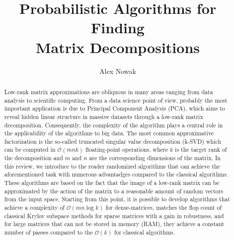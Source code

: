 \documentclass{amsart}
\theoremstyle{definition}
\theoremstyle{remark}
\numberwithin{equation}{section}
\begin{document}
\title{Probabilistic Algorithms for Finding \\ Matrix Decompositions}

\author{Alex Nowak}
\address{Department of Mathematics \\
\'Ecole Normale Sup\'erieure de Cachan}






\begin{abstract}
Low-rank matrix approximations are obliquous in many areas ranging
from data analysis to scientific computing. From a data science point of
view, probably the most important application is due to Principal
Component Analysis (PCA), which aims to reveal hidden linear structure in
massive datasets through a low-rank matrix decomposition. 
Consequently, the complexity of the algorithm plays a central role in the
applicability of the algorithms to big data. The most common
approximative factorization
is the so-called truncated singular value decomposition (k-SVD) which can be 
computed in $\mathcal{O}(mnk)$ floating-point operations, where $k$ is the target rank
of the decomposition and $m$ and $n$ are the corresponding dimensions of the 
matrix.
In this review, we introduce to the reader randomized algorithms 
that can achieve the aforementioned task with numerous advantadges compared
to the classical algorithms. These algorithms are based on the fact that the
image of a low-rank matrix can be approximated by the action
of the matrix to a reasonable amount of random vectors from the input space.
Starting from this point, it is possible to develop
algorithms that achieve a complexity of $\mathcal{O}(mn\log{k})$ for 
dense-matrices, matches the flop count of classical
Krylov subspace methods for sparse matrices with a gain in robustness, and
for large matrices that can not be stored in memory (RAM), they
achieve a constant number of passes compared to the 
$\mathcal{O}(k)$ for classical algorithms.
\end{abstract}

\maketitle





\printbibliography[heading=bibintoc]
% 

% 
\end{document}
